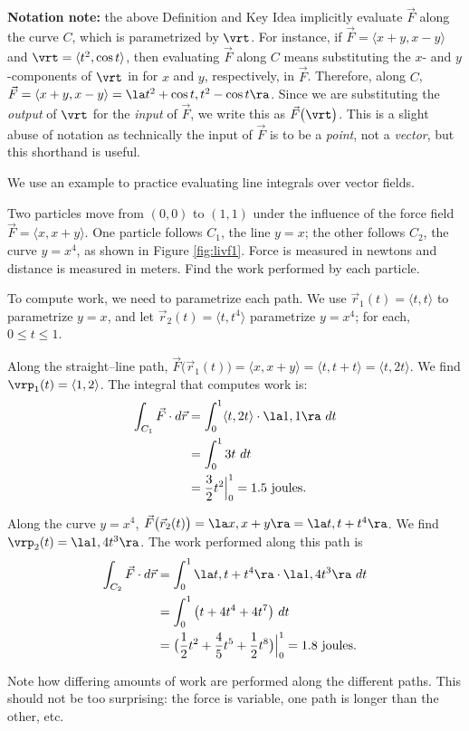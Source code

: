 \textbf{Notation note:} the above Definition and Key Idea implicitly evaluate $\vec F$ along the curve $C$, which is parametrized by $\vrt$. For instance, if $\vec F = \langle x+y, x-y\rangle$ and $\vrt = \langle t^2,\cos t\rangle$, then evaluating $\vec F$ along $C$ means substituting the $x$- and $y$-components of $\vrt$ in for $x$ and $y$, respectively, in $\vec F$. Therefore, along $C$, $\vec F = \langle x+y,x-y\rangle = \la t^2+\cos t, t^2-\cos t\ra$. Since we are substituting the \emph{output} of $\vrt$ for the \emph{input} of $\vec F$, we write this as $\vec F\big(\vrt\big)$. This is a slight abuse of notation as technically the input of $\vec F$ is to be a \emph{point}, not a \emph{vector}, but this shorthand is useful.

We use an example to practice evaluating line integrals over vector fields.\\

{Two particles move from $(0,0)$ to $(1,1)$ under the influence of the force field $\vec F  = \langle x, x+y\rangle$. One particle follows $C_1$, the line $y=x$; the other follows $C_2$, the curve $y=x^4$, as shown in Figure \ref{fig:livf1}. Force is measured in newtons and distance is measured in meters. Find the work performed by each particle.
}
{To compute work, we need to parametrize each path. We use $\vec r_1(t) = \langle t,t\rangle$ to parametrize $y=x$, and let $\vec r_2(t) =\langle t,t^4\rangle$ parametrize $y=x^4$; for each, $0\leq t\leq 1$. 

Along the straight--line path, $\vec F\big(\vec r_1(t)\big) = \langle x, x+y\rangle = \langle t, t+t\rangle = \langle t,2t\rangle$. We find $\vrp_1(t) =\langle 1,2\rangle$. The integral that computes work is:
\begin{align*}
\int_{C_1} \vec F\cdot d\vec r &= \int_0^1 \langle t,2t\rangle\cdot\la 1,1\ra\ dt \\
			&= \int_0^1 3t\ dt \\
			&= \frac32t^2\Big|_0^1 = 1.5 \text{ joules}.
\end{align*}

Along the curve $y = x^4$, $\vec F\big(\vec r_2(t)\big) = \la x, x+y\ra = \la t, t+t^4\ra$. We find $\vrp_2(t) = \la 1, 4t^3\ra$. The work performed along this path is
\begin{align*}
\int_{C_2} \vec F\cdot d\vec r &= \int_0^1 \la t,t+t^4\ra\cdot\la 1,4t^3\ra\ dt\\
			&= \int_0^1 \big(t + 4t^4+ 4t^7\big)\ dt \\
			&= \big(\frac12t^2 + \frac45t^5 + \frac12t^8\big)\Big|_0^1 =  1.8 \text{ joules}.
\end{align*}

Note how differing amounts of work are performed along the different paths. This should not be too surprising: the force is variable, one path is longer than the other, etc.
}\\

